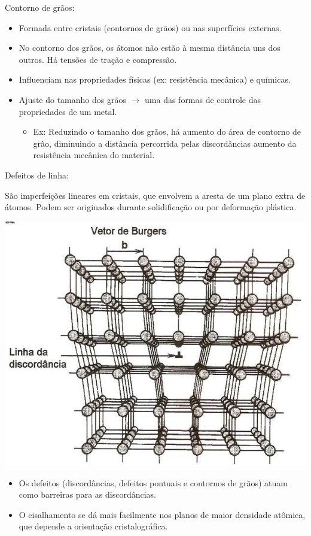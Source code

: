 Contorno de grãos:

\begin{itemize}
	\item Formada entre cristais (contornos de grãos) ou nas superfícies externas.
	\item No contorno dos grãos, os átomos não estão à mesma distância uns dos outros. Há tensões de tração e compressão.
	\item Influenciam nas propriedades físicas (ex: resistência mecânica) e químicas.
	\item Ajuste do tamanho dos grãos $\rightarrow$ uma das formas de controle das propriedades de um metal.
	\begin{itemize}
		\item Ex: Reduzindo o tamanho dos grãos, há aumento do área de contorno de grão, diminuindo a distância percorrida pelas discordâncias aumento da resistência mecânica do material.
	\end{itemize}
\end{itemize}

Defeitos de linha:

São imperfeições lineares em cristais, que envolvem a aresta de um plano extra de átomos. Podem ser originados durante solidificação ou por deformação plástica.

\includegraphics[scale=0.4,trim={0 0 0 0}]{figures/defLinhas}

\begin{itemize}
	\item Os defeitos (discordâncias, defeitos pontuais e contornos de grãos) atuam como barreiras para as discordâncias.
	\item O cisalhamento se dá mais facilmente nos planos de maior densidade atômica, que depende a orientação cristalográfica.
\end{itemize}


